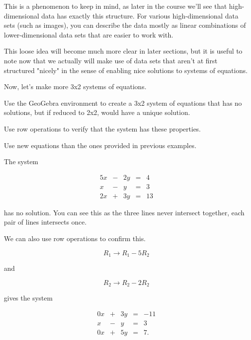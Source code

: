 \documentclass{ximera}
\begin{document}
\begin{exploration}
\begin{remark}
        This is a phenomenon to keep in mind, as later in the course we'll see that high-dimensional data has exactly this structure. For various high-dimensional data sets (such as images), you can describe the data mostly as linear combinations of lower-dimensional data sets that are easier to work with. 
        
        This loose idea will become much more clear in later sections, but it is useful to note now that we actually will make use of data sets that aren't at first structured "nicely" in the sense of enabling nice solutions to systems of equations.
    
    \end{remark}
    
    Now, let's make more 3x2 systems of equations.
    
    \begin{example}
    
        Use the GeoGebra environment to create a 3x2 system of equations that has no solutions, but if reduced to 2x2, would have a unique solution.
    
        Use row operations to verify that the system has these properties.
    
        Use new equations than the ones provided in previous examples. 
    
        \begin{solution}
    
            The system
    
            $$\begin{array}{ccccc}
                    5x & -&2y&=&4 \\
                    x& -&y&=&3 \\
                    2x& +&3y&=&13
                \end{array}$$
    
            has no solution. You can see this as the three lines never intersect together, each pair of lines intersects once. 
    
            We can also use row operations to confirm this.
    
            $$R_1\rightarrow R_1-5R_2$$
    
            and
            
            $$R_2\rightarrow R_2-2R_2$$
    
            gives the system
    
            $$\begin{array}{ccccc}
                    0x & +&3y&=&-11 \\
                    x& -&y&=&3 \\
                    0x& +&5y&=&7.
                \end{array}$$
    

\end{solution}
\end{example}
\end{exploration}
\end{document}
